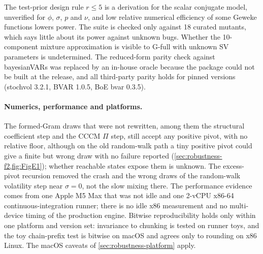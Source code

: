 The test-prior design rule $r \leq 5$ is a derivation for the scalar conjugate model, unverified for
$\phi$, $\sigma$, $p$ and $\nu$, and low relative numerical efficiency of some Geweke functions
lowers power. %
The suite is checked only against 18 curated mutants, which says little about its power against
unknown bugs. Whether the 10-component mixture
approximation is visible to G-full with unknown SV parameters is undetermined. The reduced-form
parity check against bayesianVARs was replaced by an in-house oracle because the package could not
be built at the release, and all third-party parity holds for pinned versions (stochvol
3.2.1, BVAR 1.0.5, BoE bvar 0.3.5). %

\paragraph{Numerics, performance and platforms.}
The formed-Gram draws that were not rewritten, among them the structural coefficient step and the
CCCM $\Pi$ step, still accept any positive pivot, with no relative floor, although on the old
random-walk path a tiny positive pivot could give a finite but wrong draw with no failure reported
(\cref{sec:robustness-f2,fig:FigE1}); whether reachable states expose them is unknown. %
The excess-pivot recursion removed the crash and the wrong draws of the random-walk volatility
step near $\sigma = 0$, not the slow mixing there. %
The performance evidence comes from one Apple M5 Max that was not idle and one 2-vCPU x86-64
continuous-integration runner; there is no idle x86 measurement and no multi-device timing of the
production engine. %
Bitwise reproducibility holds only within one platform and version set: invariance to chunking is
tested on runner toys, and the toy chain-prefix test is bitwise on macOS and agrees only to rounding
on x86 Linux. %
The macOS caveats of \cref{sec:robustness-platform} apply.

